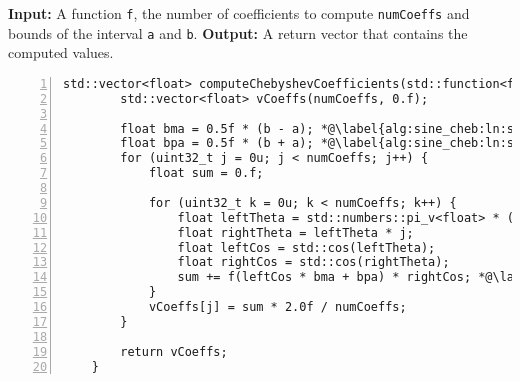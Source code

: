 
\begin{algorithm}
    \caption{Computing Chebyshev Coefficients}
    \begin{algorithmic}[1]
    \State \textbf{Input:} A function \texttt{f}, the number of coefficients to compute \texttt{numCoeffs} and bounds of the interval \texttt{a} and \texttt{b}.
    \State \textbf{Output:} A return vector that contains the computed values.
\begin{lstlisting}[numbers=left]
    std::vector<float> computeChebyshevCoefficients(std::function<float(float)> f, uint32_t numCoeffs, float a, float b) {
        std::vector<float> vCoeffs(numCoeffs, 0.f);

        float bma = 0.5f * (b - a); *@\label{alg:sine_cheb:ln:scaling_back_0}@*
        float bpa = 0.5f * (b + a); *@\label{alg:sine_cheb:ln:scaling_back_1}@*
        for (uint32_t j = 0u; j < numCoeffs; j++) {
            float sum = 0.f;

            for (uint32_t k = 0u; k < numCoeffs; k++) {
                float leftTheta = std::numbers::pi_v<float> * (k + 0.5f) / numCoeffs;
                float rightTheta = leftTheta * j;
                float leftCos = std::cos(leftTheta);
                float rightCos = std::cos(rightTheta);
                sum += f(leftCos * bma + bpa) * rightCos; *@\label{alg:sine_cheb:ln:scaling_back_2}@*
            }
            vCoeffs[j] = sum * 2.0f / numCoeffs;
        }

        return vCoeffs;
    }
\end{lstlisting}
\end{algorithmic}
 \label{alg:cheb_coef}
\end{algorithm}